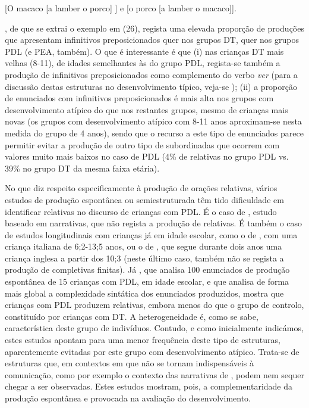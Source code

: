 \documentclass[output=paper,colorlinks,citecolor=brown,booklanguage=portuguese]{langscibook}
\begin{document}
\ea
    \label{ex:13:26} [O macaco [a lamber o porco] ] e [o porco [a lamber o macaco]].
\z
    
\citet{Martinsempreparacao}, de que se extrai o exemplo em (26), regista uma elevada proporção de produções que apresentam infinitivos preposicionados quer nos grupos DT, quer nos grupos PDL (e PEA, também).  O que é interessante é que (i) nas crianças DT mais velhas (8-11), de idades semelhantes às do grupo PDL, regista-se também a produção de infinitivos preposicionados como complemento do verbo \emph{ver} (para a discussão destas estruturas no desenvolvimento típico, veja-se \citealp{Santos2016}); (ii) a proporção de enunciados com infinitivos preposicionados é mais alta nos grupos com desenvolvimento atípico do que nos restantes grupos, mesmo de crianças mais novas (os grupos com desenvolvimento atípico com 8-11 anos aproximam-se nesta medida do grupo de 4 anos), sendo que o recurso a este tipo de enunciados parece permitir evitar a produção de outro tipo de subordinadas que ocorrem com valores muito mais baixos no caso de PDL (4\% de relativas no grupo PDL vs. 39\% no grupo DT da mesma faixa etária).

No que diz respeito especificamente à produção de orações relativas, vários estudos de produção espontânea ou semiestruturada têm tido dificuldade em identificar relativas no discurso de crianças com PDL. É o caso de \citet[80]{SuaKay19971998}, estudo baseado em narrativas, que não regista a produção de relativas. É também o caso de estudos longitudinais com crianças já em idade escolar, como o de \citet{Cipriani1998}, com uma criança italiana de 6;2-13;5 anos, ou o de \citet{Lely1997}, que segue durante dois anos uma criança inglesa a partir dos 10;3 (neste último caso, também não se regista a produção de completivas finitas). Já \citet{Marinellie2004}, que analisa 100 enunciados de produção espontânea de 15 crianças com PDL, em idade escolar, e que analisa de forma mais global a complexidade sintática dos enunciados produzidos, mostra que crianças com PDL produzem relativas, embora menos do que o grupo de controlo, constituído por crianças com DT. A heterogeneidade é, como se sabe, característica deste grupo de indivíduos. Contudo, e como inicialmente indicámos, estes estudos apontam para uma menor frequência deste tipo de estruturas, aparentemente evitadas por este grupo com desenvolvimento atípico. Trata-se de estruturas que, em contextos em que não se tornam indispensáveis à comunicação, como por exemplo o contexto das narrativas de \citeauthor{SuaKay19971998}, podem nem sequer chegar a ser observadas. Estes estudos mostram, pois, a complementaridade da produção espontânea e provocada na avaliação do desenvolvimento.
\end{document}
